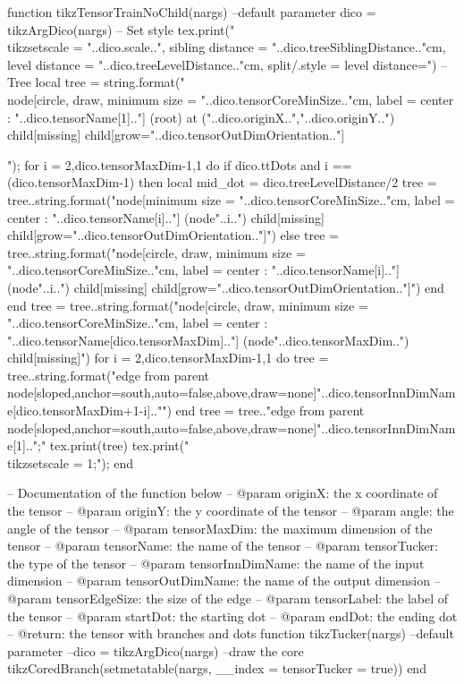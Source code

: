 \begin{luacode*}
{	function tikzTensorTrainNoChild(nargs)
		--default parameter
		dico = tikzArgDico(nargs)
		-- Set style
		tex.print("\\tikzset{scale = "..dico.scale..", sibling distance = "..dico.treeSiblingDistance.."cm, level distance = "..dico.treeLevelDistance.."cm, split/.style = {level distance=}}")
		-- Tree
		local tree = string.format("\\node[circle, draw, minimum size = "..dico.tensorCoreMinSize.."cm, label = center : "..dico.tensorName[1].."] (root) at ("..dico.originX..","..dico.originY..") {} child[missing] child[grow="..dico.tensorOutDimOrientation.."]{");
		for i = 2,dico.tensorMaxDim-1,1 do
		   	if dico.ttDots and i == (dico.tensorMaxDim-1) then
				local mid_dot = dico.treeLevelDistance/2
			   tree = tree..string.format("node[minimum size = "..dico.tensorCoreMinSize.."cm, label = center : "..dico.tensorName[i].."] (node"..i..") {} child[missing] child[grow="..dico.tensorOutDimOrientation.."]{")
		   	else
		   		tree = tree..string.format("node[circle, draw, minimum size = "..dico.tensorCoreMinSize.."cm, label = center : "..dico.tensorName[i].."] (node"..i..") {} child[missing] child[grow="..dico.tensorOutDimOrientation.."]{")
			end
		end
		tree = tree..string.format("node[circle, draw, minimum size = "..dico.tensorCoreMinSize.."cm, label = center : "..dico.tensorName[dico.tensorMaxDim].."] (node"..dico.tensorMaxDim..") {} child[missing]")
		for i = 2,dico.tensorMaxDim-1,1 do
		  tree = tree..string.format("edge from parent node[sloped,anchor=south,auto=false,above,draw=none]{"..dico.tensorInnDimName[dico.tensorMaxDim+1-i].."}}")
		end
		tree = tree.."edge from parent node[sloped,anchor=south,auto=false,above,draw=none]{"..dico.tensorInnDimName[1].."}};"
		tex.print(tree)
		tex.print("\\tikzset{scale = 1};");
	end

	-- Documentation of the function below
	-- @param originX: the x coordinate of the tensor
	-- @param originY: the y coordinate of the tensor
	-- @param angle: the angle of the tensor
	-- @param tensorMaxDim: the maximum dimension of the tensor
	-- @param tensorName: the name of the tensor
	-- @param tensorTucker: the type of the tensor
	-- @param tensorInnDimName: the name of the input dimension
	-- @param tensorOutDimName: the name of the output dimension
	-- @param tensorEdgeSize: the size of the edge
	-- @param tensorLabel: the label of the tensor
	-- @param startDot: the starting dot
	-- @param endDot: the ending dot
	-- @return: the tensor with branches and dots
	function tikzTucker(nargs)
	  --default parameter
	  --dico = tikzArgDico(nargs)
	  --draw the core
	  tikzCoredBranch(setmetatable(nargs, {__index = {tensorTucker = true}}))
	end

}}
\end{luacode*}
